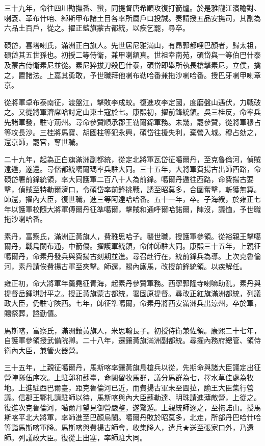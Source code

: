 \begin{pinyinscope}
三十九年，命往四川勘撫番、蠻，同提督唐希順攻復打箭爐。於是雅隴江濱瞻對、喇袞、革布什咱、綽斯甲布諸土目各率所屬戶口投誠。奏請授五品安撫司，其副為六品土百戶，從之。擢正藍旗蒙古都統，以疾乞罷，尋卒。

碩岱，喜塔喇氏，滿洲正白旗人。先世居尼雅滿山，有昂郭都哩巴顏者，歸太祖，碩岱其五世孫也。初授二等侍衛，兼甲喇額真。世祖幸南苑，碩岱與一等伯巴什泰及蒙古侍衛素尼並從。素尼猝拔刀殺巴什泰，碩岱即舉所執長槍擊素尼，立僕，擒之，置諸法。上嘉其勇敢，予世職拜他喇布勒哈番兼拖沙喇哈番。授巴牙喇甲喇章京。

從將軍卓布泰南征，渡盤江，擊敗李成蛟。復進攻李定國，度磨盤山遇伏，力戰破之。又從將軍濟席哈討定山東土寇於七。康熙初，擢前鋒統領。吳三桂反，命率兵先諸軍發，駐守荊州。尋命參贊順承郡王勒爾錦軍務。未幾，罷參贊，從將軍穆占等攻長沙。三桂將馬寶、胡國柱等犯永興，碩岱往援失利，棄營入城。穆占劾之，還京師，罷官，奪世職。

二十九年，起為正白旗滿洲副都統，從定北將軍瓦岱征噶爾丹，至克魯倫河，偵賊遠遁，遂還。尋偕都統噶爾瑪率兵駐大同。三十五年，大將軍費揚古出師西路，命碩岱署前鋒統領，率大同護軍二百八十人為前鋒。噶爾丹遁往西路，命費揚古要擊，偵賊至特勒爾濟口，令碩岱率前鋒挑戰，誘至昭莫多，合圍奮擊，斬獲無算。師還，擢內大臣，復世職，進三等阿達哈哈番。五十一年，卒。子海綬，於雍正七年以護軍校隨大將軍傅爾丹征準噶爾，擊賊和通呼爾哈諾爾，陣沒，議恤，予世職拖沙喇哈番。

素丹，富察氏，滿洲正黃旗人，費雅思哈子。襲世職，授護軍參領。從裕親王擊噶爾丹，戰烏闌布通，中箭傷。擢護軍統領，命帥師駐大同。康熙三十五年，上親征噶爾丹，命素丹發兵與費揚古刻期並進。尋召赴行在，統前鋒兵為導。上次克魯倫河，素丹請俟費揚古軍至夾擊。師還，賜內廝馬，改授前鋒統領。以疾解任。

雍正初，命大將軍年羹堯征青海，起素丹參贊軍務。西寧郭隆寺喇嘛助亂，素丹與提督岳鍾琪討平之。授正黃旗蒙古都統，署固原提督。尋改正紅旗滿洲都統，列議政大臣，仍駐守陜西。七年，師征準噶爾，命素丹將西安滿洲兵出涼州，卒於軍，賜祭葬，謚勤僖。

馬斯喀，富察氏，滿洲鑲黃旗人，米思翰長子。初授侍衛兼佐領。康熙二十七年，自護軍參領授武備院卿。二十八年，遷鑲黃旗滿洲副都統。尋擢內務府總管、領侍衛內大臣，兼管火器營。

三十五年，上親征噶爾丹，馬斯喀率鑲黃旗鳥槍兵以從，先期命與諸大臣議定出征營陣隊伍序次。上駐郭和蘇臺，命閱留牧馬群，議分馬群為七，擇水草佳處為牧地。上進駐西巴爾臺，距克魯倫河已近，而費揚古軍未至圖拉，諭王大臣集行營議。信郡王鄂扎請駐師以待，馬斯喀與內大臣蘇勒達、明珠請進薄敵營，上從之。復進次克魯倫河，噶爾丹望見御營嚴整，遂驚遁。上親統師逐之，至拖諾山。授馬斯喀平北大將軍，率師進至巴顏烏闌。噶爾丹敗於昭莫多，北走，所部丹巴哈什哈等詣馬斯喀軍降。馬斯喀與費揚古師會，收集降人，遣兵★送至張家口外，乃還師。列議政大臣。復從上出塞，率師駐大同。


\end{pinyinscope}
